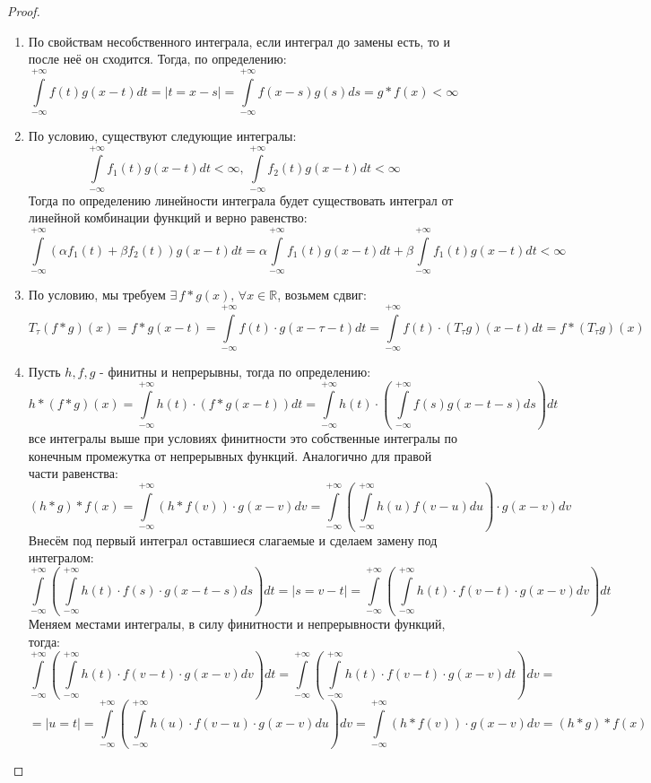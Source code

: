 \documentclass[12pt]{article}
\newcommand{\MR}{\mathbb{R}}
\theoremstyle{definition}
\newcommand{\ddint}[2]{\displaystyle\int\limits_{#1}^{#2}}
\begin{document}
\begin{proof}\hfill
	\begin{enumerate}[label=(\arabic*)]
		\item По свойствам несобственного интеграла, если интеграл до замены есть, то и после неё он сходится. Тогда, по определению:
		$$
			\ddint{-\infty}{+\infty} f(t)g(x -t)dt = |t = x - s| = \ddint{-\infty}{+\infty} f(x - s)g(s)ds = g*f(x) < \infty 
		$$
		\item По условию, существуют следующие интегралы:
		$$
			\ddint{-\infty}{+\infty} f_1(t)g(x -t)dt < \infty, \, \ddint{-\infty}{+\infty} f_2(t)g(x -t)dt < \infty
		$$
		Тогда по определению линейности интеграла будет существовать интеграл от линейной комбинации функций и верно равенство:
		$$
			\ddint{-\infty}{+\infty}\left(\alpha f_1(t) + \beta f_2(t)\right)g(x -t)dt = \alpha \ddint{-\infty}{+\infty} f_1(t)g(x -t)dt + \beta \ddint{-\infty}{+\infty} f_1(t)g(x -t)dt < \infty
		$$
		\setcounter{enumi}{3}
		\item По условию, мы требуем $\exists \, f*g(x), \, \forall x \in \MR$, возьмем сдвиг:
		$$
			T_\tau(f*g)(x) = f*g(x-t) = \ddint{-\infty}{+\infty}f(t){\cdot}g(x - \tau -t)dt = \ddint{-\infty}{+\infty}f(t){\cdot}(T_\tau g)(x - t)dt = f*(T_\tau g)(x)
		$$
		\setcounter{enumi}{2}
		\item Пусть $h,f,g$ - финитны и непрерывны, тогда по определению:
		$$
			h*(f*g)(x) =
			\ddint{-\infty}{+\infty}h(t){\cdot}\!\left(f*g(x-t)\right)dt = 
			\ddint{-\infty}{+\infty}h(t){\cdot}\!\!\left(\,\ddint{-\infty}{+\infty}f(s)g(x-t -s)ds\right)dt
		$$
		все интегралы выше при условиях финитности это собственные интегралы по конечным промежутка от непрерывных функций. Аналогично для правой части равенства:
		$$
			(h*g)*f(x) = \ddint{-\infty}{+\infty}\left( h*f(v)\right){\cdot}g(x-v)dv =  \ddint{-\infty}{+\infty}\left(\, \ddint{-\infty}{+\infty}h(u)f(v -u)du\right){\cdot}g(x-v)dv
		$$
		Внесём под первый интеграл оставшиеся слагаемые и сделаем замену под интегралом:
		$$
			\ddint{-\infty}{+\infty}\left(\,\ddint{-\infty}{+\infty}h(t){\cdot}f(s){\cdot} g(x-t -s)ds\right)dt = |s = v - t| = \ddint{-\infty}{+\infty}\left(\,\ddint{-\infty}{+\infty}h(t){\cdot}f(v-t){\cdot} g(x-v)dv\right)dt
		$$
		Меняем местами интегралы, в силу финитности и непрерывности функций, тогда:
		$$
			\ddint{-\infty}{+\infty}\left(\,\ddint{-\infty}{+\infty}h(t){\cdot}f(v-t){\cdot} g(x-v)dv\right)dt = \ddint{-\infty}{+\infty}\left(\,\ddint{-\infty}{+\infty}h(t){\cdot}f(v-t){\cdot} g(x-v)dt\right)dv = 
		$$
		$$
			=|u = t| = \ddint{-\infty}{+\infty}\left(\,\ddint{-\infty}{+\infty}h(u){\cdot}f(v-u){\cdot} g(x-v)du\right)dv = \ddint{-\infty}{+\infty}\left( h*f(v)\right){\cdot}g(x-v)dv = (h*g)*f(x)
		$$
	\end{enumerate}
\end{proof}
\end{document}

